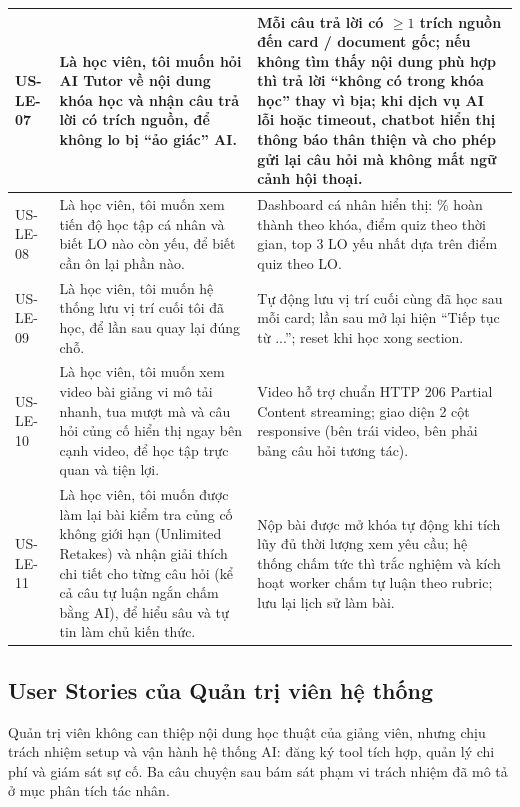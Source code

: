 \begin{longtable}{|p{1.6cm}|p{5.6cm}|p{7cm}|}
\hline
US-LE-07 & Là học viên, tôi muốn hỏi AI Tutor về nội dung khóa học và nhận câu trả lời \textbf{có trích nguồn}, để không lo bị ``ảo giác'' AI. & Mỗi câu trả lời có \(\geq 1\) trích nguồn đến card / document gốc; nếu không tìm thấy nội dung phù hợp thì trả lời ``không có trong khóa học'' thay vì bịa; khi dịch vụ AI lỗi hoặc timeout, chatbot hiển thị thông báo thân thiện và cho phép gửi lại câu hỏi mà không mất ngữ cảnh hội thoại. \\
\hline
US-LE-08 & Là học viên, tôi muốn xem tiến độ học tập cá nhân và biết LO nào còn yếu, để biết cần ôn lại phần nào. & Dashboard cá nhân hiển thị: \% hoàn thành theo khóa, điểm quiz theo thời gian, top 3 LO yếu nhất dựa trên điểm quiz theo LO. \\
\hline
US-LE-09 & Là học viên, tôi muốn hệ thống lưu vị trí cuối tôi đã học, để lần sau quay lại đúng chỗ. & Tự động lưu vị trí cuối cùng đã học sau mỗi card; lần sau mở lại hiện ``Tiếp tục từ ...''; reset khi học xong section. \\
\hline
US-LE-10 & Là học viên, tôi muốn xem video bài giảng vi mô tải nhanh, tua mượt mà và câu hỏi củng cố hiển thị ngay bên cạnh video, để học tập trực quan và tiện lợi. & Video hỗ trợ chuẩn HTTP 206 Partial Content streaming; giao diện 2 cột responsive (bên trái video, bên phải bảng câu hỏi tương tác). \\
\hline
US-LE-11 & Là học viên, tôi muốn được làm lại bài kiểm tra củng cố không giới hạn (Unlimited Retakes) và nhận giải thích chi tiết cho từng câu hỏi (kể cả câu tự luận ngắn chấm bằng AI), để hiểu sâu và tự tin làm chủ kiến thức. & Nộp bài được mở khóa tự động khi tích lũy đủ thời lượng xem yêu cầu; hệ thống chấm tức thì trắc nghiệm và kích hoạt worker chấm tự luận theo rubric; lưu lại lịch sử làm bài. \\
\hline
\end{longtable}
\endgroup

\subsection{User Stories của Quản trị viên hệ thống}

Quản trị viên không can thiệp nội dung học thuật của giảng viên, nhưng chịu
trách nhiệm setup và vận hành hệ thống AI: đăng ký tool tích hợp, quản lý chi
phí và giám sát sự cố. Ba câu chuyện sau bám sát phạm vi trách nhiệm đã mô tả
ở mục phân tích tác nhân.


